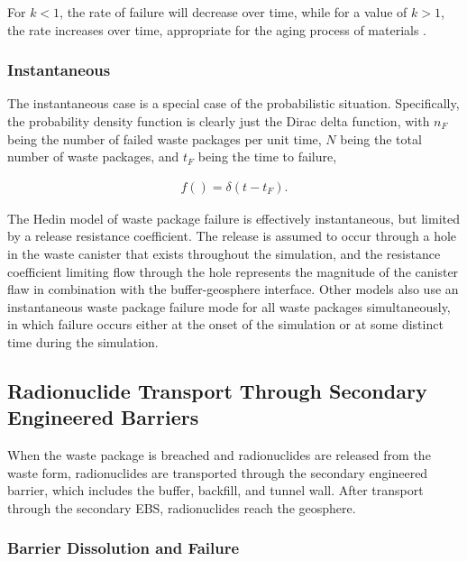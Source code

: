 For $k<1$, the rate of failure will decrease over time, while for a value of 
$k>1$, the rate increases over time, appropriate for the aging process of 
materials  \cite{papoulis_probability_2002}.


\subsubsection{Instantaneous}

The instantaneous case is a special case of the probabilistic situation.
Specifically, the probability density function is clearly just the Dirac 
delta function, with $n_F$ being the number of failed waste packages per 
unit time, $N$ being the total number of waste packages, and $t_F$ being 
the time to failure,

\begin{align}
  f()= \delta(t-t_F).
  \label{instantaneous}
\end{align}


The Hedin model of waste package failure is effectively instantaneous, but
limited by a release resistance coefficient. The release is assumed  to occur
through a hole in the waste canister that exists throughout the simulation, and
the resistance coefficient limiting flow through the hole represents the
magnitude of the canister flaw in combination with the buffer-geosphere
interface\cite{hedin_integrated_2002}.  Other models also use an instantaneous 
waste package failure mode for all waste  packages simultaneously, in which 
failure occurs either at the onset of the simulation or at some distinct time 
during the simulation. 




\subsection{Radionuclide Transport Through Secondary Engineered Barriers}

When the waste package is breached and radionuclides are released from the waste 
form, radionuclides are transported through the secondary engineered barrier, 
which includes the buffer, backfill, and tunnel wall. After transport through 
the secondary \gls{EBS}, radionuclides reach the geosphere. 

\subsubsection{Barrier Dissolution and Failure}

